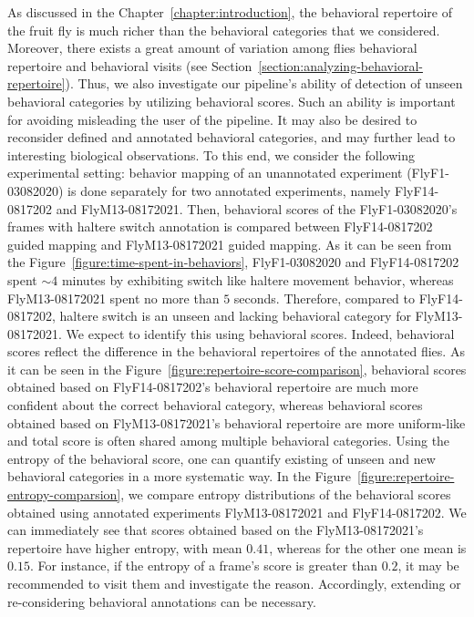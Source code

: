 As discussed in the Chapter~\ref{chapter:introduction}, the behavioral repertoire of the fruit fly is much richer than the behavioral categories that we considered.
Moreover, there exists a great amount of variation among flies behavioral repertoire and behavioral visits (see Section~\ref{section:analyzing-behavioral-repertoire}).
Thus, we also investigate our pipeline's ability of detection of unseen behavioral categories by utilizing behavioral scores.
Such an ability is important for avoiding misleading the user of the pipeline. It may also be desired to reconsider defined and annotated behavioral categories, and may further lead to interesting biological observations.
To this end, we consider the following experimental setting: behavior mapping of an unannotated experiment (FlyF1-03082020) is done separately for two annotated experiments, namely FlyF14-0817202 and FlyM13-08172021.
Then, behavioral scores of the FlyF1-03082020's frames with haltere switch annotation is compared between FlyF14-0817202 guided mapping and FlyM13-08172021 guided mapping.
As it can be seen from the Figure~\ref{figure:time-spent-in-behaviors}, FlyF1-03082020 and FlyF14-0817202 spent ${\sim}4$ minutes by exhibiting switch like haltere movement behavior, whereas FlyM13-08172021 spent no more than $5$ seconds.
Therefore, compared to FlyF14-0817202, haltere switch is an unseen and lacking behavioral category for FlyM13-08172021.
We expect to identify this using behavioral scores.
Indeed, behavioral scores reflect the difference in the behavioral repertoires of the annotated flies.
As it can be seen in the Figure~\ref{figure:repertoire-score-comparison}, behavioral scores obtained based on FlyF14-0817202's behavioral repertoire are much more confident about the correct behavioral category, whereas behavioral scores obtained based on FlyM13-08172021's behavioral repertoire are more uniform-like and total score is often shared among multiple behavioral categories.
Using the entropy of the behavioral score, one can quantify existing of unseen and new behavioral categories in a more systematic way.
In the Figure~\ref{figure:repertoire-entropy-comparsion}, we compare entropy distributions of the behavioral scores obtained using annotated experiments FlyM13-08172021 and FlyF14-0817202.
We can immediately see that scores obtained based on the FlyM13-08172021's repertoire have higher entropy, with mean $0.41$, whereas for the other one mean is $0.15$.
For instance, if the entropy of a frame's score is greater than $0.2$, it may be recommended to visit them and investigate the reason.
Accordingly, extending or re-considering behavioral annotations can be necessary.


